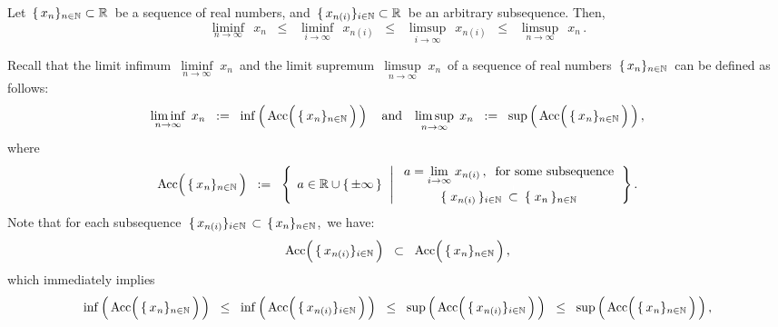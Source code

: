 \begin{lemma}
\label{LiminfLimsupSubsequences}
\mbox{}\vskip 0.1cm
\noindent
Let
\,$\{\,x_{n}\}_{n\in\mathbb{N}} \subset \mathbb{R}$\,
be a sequence of real numbers, and
\,$\{\,x_{n(i)}\}_{i\in\mathbb{N}} \subset \mathbb{R}$\,
be an arbitrary subsequence.
Then,
\begin{equation*}
\underset{n\rightarrow\infty}{\liminf}\;\, x_{n}
\;\; \leq \;\;
	\underset{i\rightarrow\infty}{\liminf}\;\, x_{n(i)}
\;\; \leq \;\;
	\underset{i\rightarrow\infty}{\limsup}\;\, x_{n(i)}
\;\; \leq \;\;
	\underset{n\rightarrow\infty}{\limsup}\;\, x_{n}\,.
\end{equation*}
\end{lemma}
\proof
Recall that the limit infimum
\,$\underset{n\rightarrow\infty}{\liminf}\;x_{n}$\,
and the limit supremum
\,$\underset{n\rightarrow\infty}{\limsup}\;x_{n}$\,
of a sequence of real numbers
\,$\{\,x_{n}\}_{n\in\mathbb{N}}$\, can be defined as follows:
\begin{equation*}
\underset{n\rightarrow\infty}{\liminf}\;\,x_{n}
\;\; := \;\;
	\inf\left(\,\textnormal{Acc}\!\left(\,\{\,\overset{{\color{white}-}}{x}_{n}\}_{n\in\N}\,\right)\,\right)
\quad\textnormal{and}\quad
\underset{n\rightarrow\infty}{\limsup}\;\,x_{n}
\;\; := \;\;
	\sup\left(\,\textnormal{Acc}\!\left(\,\{\,\overset{{\color{white}-}}{x}_{n}\}_{n\in\N}\,\right)\,\right),
\end{equation*}
where
\begin{equation*}
\textnormal{Acc}\!\left(\,\{\,\overset{{\color{white}-}}{x}_{n}\}_{n\in\N}\,\right)
	\;\; := \;\;
	\left\{\;\,
	a \in \Re\cup\{\,\pm\infty\,\}
	\;\,\left\vert\;
		\begin{array}{c}
			a = \underset{i\rightarrow\infty}{\lim}\;x_{n(i)}\,,\;\;\textnormal{for some subsequence}
			\\
			\textnormal{$\{\;x_{n(i)}\,\}_{i\in\N}$
				\,$\overset{{\color{white}1}}{\subset}$\,
				$\{\;x_{n}\,\}_{n\in\N}$}
		\end{array}
	\right.
	\right\}.
\end{equation*}
Note that for each subsequence \,$\{\,x_{n(i)}\}_{i\in\mathbb{N}} \,\subset\, \{\,x_{n}\}_{n\in\mathbb{N}}$,\, we have:
\begin{equation*}
\textnormal{Acc}\!\left(\,\{\,\overset{{\color{white}-}}{x}_{n(i)}\}_{i\in\N}\,\right)
\;\;\subset\;\;
	\textnormal{Acc}\!\left(\,\{\,\overset{{\color{white}-}}{x}_{n}\}_{n\in\N}\,\right),
\end{equation*}
which immediately implies
\begin{equation*}
\inf\left(\,\textnormal{Acc}\!\left(\,\{\,\overset{{\color{white}-}}{x}_{n}\}_{n\in\N}\,\right)\,\right)
\;\;\leq\;\;
	\inf\left(\,\textnormal{Acc}\!\left(\,\{\,\overset{{\color{white}-}}{x}_{n(i)}\}_{i\in\N}\,\right)\,\right)
\;\;\leq\;\;
	\sup\left(\,\textnormal{Acc}\!\left(\,\{\,\overset{{\color{white}-}}{x}_{n(i)}\}_{i\in\N}\,\right)\,\right)
\;\;\leq\;\;
	\sup\left(\,\textnormal{Acc}\!\left(\,\{\,\overset{{\color{white}-}}{x}_{n}\}_{n\in\N}\,\right)\,\right),
\end{equation*}
